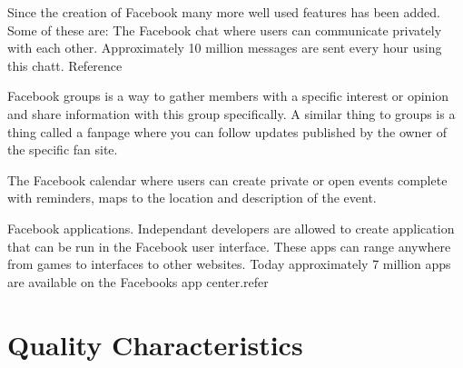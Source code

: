 \documentclass[conference]{IEEEtran}
\begin{document}
Since the creation of Facebook many more well used features has been added.
Some of these are: The Facebook chat where users can communicate privately with
each other. Approximately 10 million messages are sent every hour using this
chatt. Reference

Facebook groups is a way to gather members with a specific interest or opinion
and share information with this group specifically. A similar thing to groups
is a thing called a fanpage where you can follow updates published by the owner
of the specific fan site.

The Facebook calendar where users can create private or open events complete
with reminders, maps to the location and description of the event.

Facebook applications. Independant developers are allowed to create application
that can be run in the Facebook user interface. These apps can range anywhere
from games to interfaces to other websites. Today approximately 7 million apps
are available on the  Facebooks app center.refer

\section{Quality Characteristics}
\label{quality}
\end{document}

